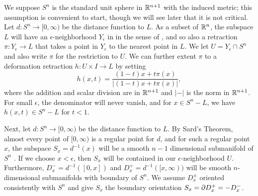 \begin{example}
We suppose $S^n$ is the standard unit sphere in $\mathbb{R}^{n+1}$ with the induced metric; this assumption is convenient to start, though we will see later that it is not critical.
Let $d \colon S^n \to [0,\infty)$ be the distance function to $L$.
As a subset of $\mathbb{R}^n$, the subspace $L$ will have an $\epsilon$-neighborhood $Y_\epsilon$ in in the sense of \cite[Section 2.3]{GuPo74}, and so also a retraction $\pi \colon Y_\epsilon \to L$ that takes a point in $Y_\epsilon$ to the nearest point in $L$.
We let $U = Y_\epsilon \cap S^n$ and also write $\pi$ for the restriction to $U$.
We can further extent $\pi$ to a deformation retraction $h \colon U \times I \to L$ by setting
$$h(x,t) = \frac{(1-t)x + t\pi(x)}{|(1-t)x + t\pi(x)|},$$
where the addition and scalar division are in $\mathbb{R}^{n+1}$ and $|-|$ is the norm in $\mathbb{R}^{n+1}$.
For small $\epsilon$, the denominator will never vanish, and for $x \in S^n -L$, we have $h(x,t) \in S^n -L$ for $t < 1$.

Next, let $d \colon S^n \to [0,\infty)$ be the distance function to $L$.
By Sard's Theorem, almost every point of $[0,\infty)$ is a regular point for $d$, and for such a regular point $x$, the subspace $S_x = d^{-1}(x)$ will be a smooth $n-1$ dimensional submanifold of $S^n$ \cite[Section 2.1]{GuPo74}.
If we choose $x < \epsilon$, then $S_x$ will be contained in our $\epsilon$-neighborhood $U$.
Furthermore, $D_x^- = d^{-1}([0,x])$ and $D_x^+ = d^{-1}([x,\infty))$ will be smooth $n$-dimensional submanifolds with boundary of $S^n$.
We assume $D^{\pm}_x$ oriented consistently with $S^n$ and give $S_x$ the boundary orientation $S_x = \partial D_x^+ = -D_x^-$.


\begin{comment}
Recall that we assume the components $L_i$ of $L$ have pairwise disjoint tubular neighborhoods $U_i$.
We identify these neighborhoods with normal bundles that we may further assume have been given smooth Riemannian bundle metrics.
This allows us to identify sphere bundles $S_a$ and the disk bundles $D_a$ consisting respectively of the elements of length $a$ or $\leq a$ in each Euclidean fiber.
Identifying the normal bundles with $U_i$, we think of the $S_a$ as smooth $n-1$ dimensional submanifolds of $S^n$ and of the $D_a$ as smooth $n$-dimensional submanifolds with boundary.
We can take $D_a$ to be oriented consistently with $S^n$ and let $S_a$ have the boundary orientation.


\end{comment}
\end{example}

